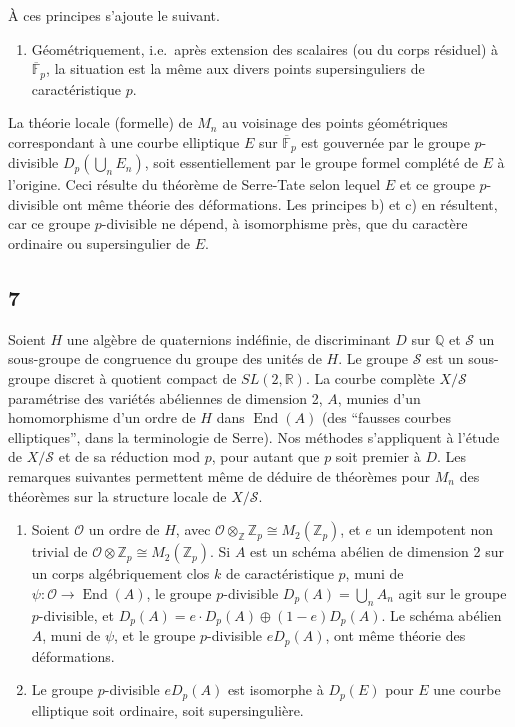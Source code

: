 \documentclass{amsart}
\theoremstyle{plain}
\theoremstyle{remark}
\DeclareMathOperator{\End}{End}
\newcommand{\bbF}{\mathbb{F}}
\newcommand{\bbQ}{\mathbb{Q}}
\newcommand{\bbR}{\mathbb{R}}
\newcommand{\bbZ}{\mathbb{Z}}
\begin{document}
\`A ces principes s'ajoute le suivant.

\begin{enumerate}
\item[c)] G\'eom\'etriquement, i.e.~apr\`es extension des scalaires (ou du corps r\'esiduel) \`a $\overline{\bbF}_p$, la situation est la m\^eme aux divers points supersinguliers de caract\'eristique $p$.
\end{enumerate}

La th\'eorie locale (formelle) de $M_n$ au voisinage des points g\'eom\'etriques correspondant \`a une courbe elliptique $E$ sur $\overline{\bbF}_p$ est gouvern\'ee par le groupe $p$-divisible $D_p(\bigcup_n E_n)$, soit essentiellement par le groupe formel compl\'et\'e de $E$ \`a l'origine. Ceci r\'esulte du th\'eor\`eme de Serre-Tate selon lequel $E$ et ce groupe $p$-divisible ont m\^eme th\'eorie des d\'eformations. Les principes b) et c) en r\'esultent, car ce groupe $p$-divisible ne d\'epend, \`a isomorphisme pr\`es, que du caract\`ere ordinaire ou supersingulier de $E$.

\subsection*{7}
Soient $H$ une alg\`ebre de quaternions ind\'efinie, de discriminant $D$ sur $\bbQ$ et $\mathcal{S}$ un sous-groupe de congruence du groupe des unit\'es de $H$. Le groupe $\mathcal{S}$ est un sous-groupe discret \`a quotient compact de $SL(2,\bbR)$. La courbe compl\`ete $X/\mathcal{S}$ param\'etrise des vari\'et\'es ab\'eliennes de dimension 2, $A$, munies d'un homomorphisme d'un ordre de $H$ dans $\End(A)$ (des ``fausses courbes elliptiques'', dans la terminologie de Serre). Nos m\'ethodes s'appliquent \`a l'\'etude de $X/\mathcal{S}$ et de sa r\'eduction mod $p$, pour autant que $p$ soit premier \`a $D$. Les remarques suivantes permettent m\^eme de d\'eduire de th\'eor\`emes pour $M_n$ des th\'eor\`emes sur la structure locale de $X/\mathcal{S}$.

\begin{enumerate}
\item[d)] Soient $\mathcal{O}$ un ordre de $H$, avec $\mathcal{O} \otimes_{\bbZ} \bbZ_p \cong M_2(\bbZ_p)$, et $e$ un idempotent non trivial de $\mathcal{O} \otimes \bbZ_p \cong M_2(\bbZ_p)$. Si $A$ est un sch\'ema ab\'elien de dimension 2 sur un corps alg\'ebriquement clos $k$ de caract\'eristique $p$, muni de $\psi: \mathcal{O} \to \End(A)$, le groupe $p$-divisible $D_p(A) = \bigcup_n A_n$ agit sur le groupe $p$-divisible, et $D_p(A) = e \cdot D_p(A) \oplus (1-e) D_p(A)$. Le sch\'ema ab\'elien $A$, muni de $\psi$, et le groupe $p$-divisible $e D_p(A)$, ont m\^eme th\'eorie des d\'eformations.
\item[e)] Le groupe $p$-divisible $e D_p(A)$ est isomorphe \`a $D_p(E)$ pour $E$ une courbe elliptique soit ordinaire, soit supersinguli\`ere.
\end{enumerate}
\end{document}
